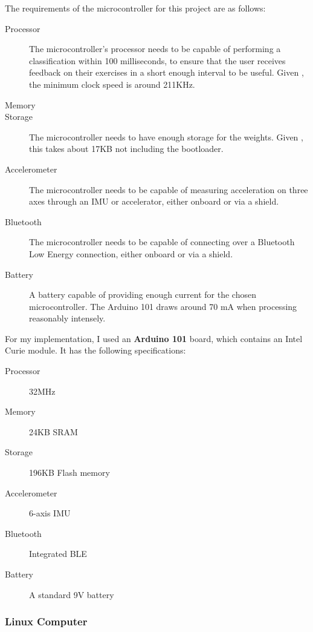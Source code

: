 \documentclass[a4paper]{article}
\begin{document}
The requirements of the microcontroller for this project are as follows:


\begin{description}
\item[Processor] The microcontroller's processor needs to be capable of performing a classification within 100 milliseconds, to ensure that the user receives feedback on their exercises in a short enough interval to be useful. Given , the minimum clock speed is around 211KHz.\cite{dsref0}
\item[Memory] 
\item[Storage] The microcontroller needs to have enough storage for the weights. Given , this takes about 17KB not including the bootloader\cite{dsref2}.
\item[Accelerometer] The microcontroller needs to be capable of measuring acceleration on three axes through an IMU or accelerator, either onboard or via a shield.
\item[Bluetooth] The microcontroller needs to be capable of connecting over a Bluetooth Low Energy connection, either onboard or via a shield.
\item[Battery] A battery capable of providing enough current for the chosen microcontroller. The Arduino 101 draws around 70 mA when processing reasonably intensely.\cite{dsref3}
\end{description}

For my implementation, I used an \textbf{Arduino 101} board, which contains an Intel Curie module. It has the following specifications:\cite{dsref4}

\begin{description}
\item[Processor] 32MHz
\item[Memory] 24KB SRAM
\item[Storage] 196KB Flash memory
\item[Accelerometer] 6-axis IMU
\item[Bluetooth] Integrated BLE 
\item[Battery] A standard 9V battery
\end{description}

\subsubsection{Linux Computer}
\end{document}
